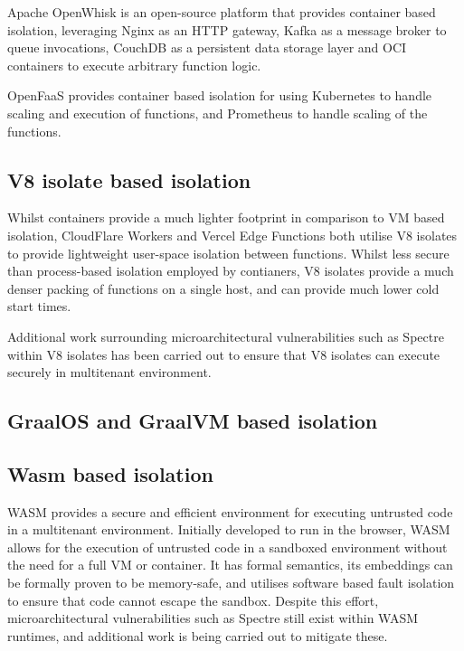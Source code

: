Apache OpenWhisk\cite{apacheOpenWhisk2024} is an open-source \faas{} platform that provides container based isolation, leveraging Nginx as an HTTP gateway, Kafka as a message broker to queue invocations, CouchDB as a persistent data storage layer and OCI containers to execute arbitrary function logic.

OpenFaaS\cite{ellisOpenFaaS2024} provides container based isolation for \faas{} using Kubernetes to handle scaling and execution of functions, and Prometheus to handle scaling of the functions.

\subsection{V8 isolate based isolation}
Whilst containers provide a much lighter footprint in comparison to VM based isolation, CloudFlare Workers\cite{CloudComputingContainers2018} and Vercel Edge Functions\cite{EdgeRuntime} both utilise V8 isolates to provide lightweight user-space isolation between functions. Whilst less secure than process-based isolation employed by contianers, V8 isolates provide a much denser packing of functions on a single host, and can provide much lower cold start times.

Additional work surrounding microarchitectural vulnerabilities such as Spectre within V8 isolates has been carried out to ensure that V8 isolates can execute securely in multitenant environment\cite{schwarzlRobustScalableProcess2022}.

\subsection{GraalOS and GraalVM based isolation}

\subsection{Wasm based isolation}
WASM provides a secure and efficient environment for executing untrusted code\cite{WebAssembly} in a multitenant environment. Initially developed to run in the browser, WASM allows for the execution of untrusted code in a sandboxed environment without the need for a full VM or container. It has formal semantics\cite{haasBringingWebSpeed2017}, its embeddings can be formally proven to be memory-safe\cite{SecurefoundationsVWasm2024}, and utilises software based fault isolation to ensure that code cannot escape the sandbox\cite{SecurityWebAssembly}. Despite this effort, microarchitectural vulnerabilities such as Spectre still exist within WASM runtimes, and additional work is being carried out to mitigate these\cite{narayanSwivelHardeningWebAssembly2021}.

